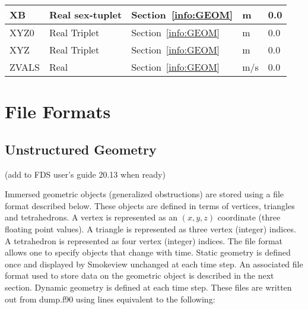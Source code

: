 \documentclass[12pt]{article}
\begin{document}
\begin{longtable}{@{\extracolsep{\fill}}|l|l|l|l|l|}
{\ct XB}           & Real sex-tuplet        & Section~\ref{info:GEOM}            &   m       &   0.0                    \\ \hline
{\ct XYZ0}         & Real Triplet           & Section~\ref{info:GEOM}            &   m       &   0.0                    \\ \hline
{\ct XYZ}          & Real Triplet           & Section~\ref{info:GEOM}            &   m       &   0.0                    \\ \hline
{\ct ZVALS}        & Real                   & Section~\ref{info:GEOM}            &   m/s     &   0.0                    \\ \hline




\end{longtable}


\vspace{\baselineskip}

\section{File Formats}

\subsection{Unstructured Geometry}
\label{out:GEOMETRY}

(add to FDS user's guide 20.13 when ready)

Immersed geometric objects (generalized obstructions) are stored using a file format described below.
These objects are defined in terms of vertices, triangles and tetrahedrons.
A vertex is represented as an $(x,y,z)$ coordinate (three floating point values).
A triangle is represented as three vertex (integer) indices.
A tetrahedron is represented
as four vertex (integer) indices.
The file format allows one to specify objects that change with time.
Static geometry is defined once and displayed by Smokeview unchanged at each time step. An associated file format used to store data  on the geometric object is described in the next section.
Dynamic geometry is defined at each time step.
These files are written out from {\ct dump.f90} using lines equivalent to the following:
\end{document}
